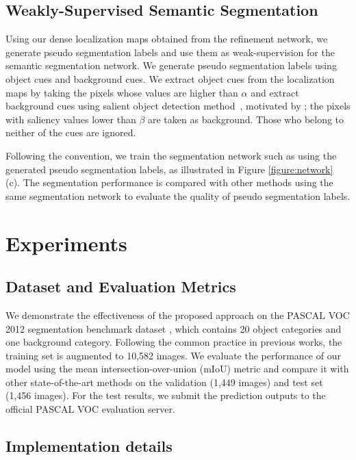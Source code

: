 \documentclass[letterpaper]{article} \usepackage{aaai21}  \usepackage{times}  \usepackage{helvet} \usepackage{courier}  \usepackage[hyphens]{url}  \usepackage{graphicx} \urlstyle{rm} \def\UrlFont{\rm}  \usepackage{natbib}  \usepackage{caption} \frenchspacing  \setlength{\pdfpagewidth}{8.5in}  \setlength{\pdfpageheight}{11in}
\begin{document}
\subsection{Weakly-Supervised Semantic Segmentation}
\label{method:4}
Using our dense localization maps obtained from the refinement network, we generate pseudo segmentation labels and use them as weak-supervision for the semantic segmentation network.
We generate pseudo segmentation labels using object cues and background cues.
We extract object cues from the localization maps by taking the pixels whose values are higher than $\alpha$ and extract background cues using salient object detection method~\cite{liu2019simple}, motivated by \cite{wei2017object, wei2018revisiting}; the pixels with saliency values lower than $\beta$ are taken as background.
Those who belong to neither of the cues are ignored.
  
Following the convention, we train the segmentation network such as \cite{chen2014semantic, chen2017deeplab} using the generated pseudo segmentation labels, as illustrated in Figure \ref{figure:network} (c).
The segmentation performance is compared with other methods using the same segmentation network to evaluate the quality of pseudo segmentation labels.



\section{Experiments}

\subsection{Dataset and Evaluation Metrics}
    
We demonstrate the effectiveness of the proposed approach on the PASCAL VOC 2012 segmentation benchmark dataset \cite{Everingham2014ThePV}, which contains 20 object categories and one background category. 
Following the common practice in previous works, the training set is augmented to 10,582 images.
We evaluate the performance of our model using the mean intersection-over-union (mIoU) metric and compare it with other state-of-the-art methods on the validation (1,449 images) and test set (1,456 images).
For the test results, we submit the prediction outputs to the official PASCAL VOC evaluation server.


\subsection{Implementation details}
\end{document}
